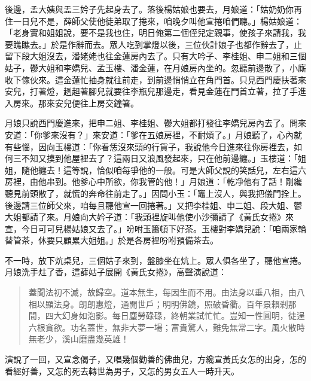 後邊，孟大姨與盂三妗子先起身去了。落後楊姑娘也要去，月娘道：「姑奶奶你再住一日兒不是，薛師父使他徒弟取了捲來，咱晚夕叫他宣捲咱們聽。」楊姑娘道：「老身實和姐姐說，要不是我也住，明日俺第二個侄兒定親事，使孩子來請我，我要瞧瞧去。」於是作辭而去。眾人吃到掌燈以後，三位伙計娘子也都作辭去了，止留下段大姐沒去，潘姥姥也往金蓮房內去了。只有大吟子、李桂姐、申二姐和三個姑子，鬱大姐和李嬌兒、孟玉樓、潘金蓮，在月娘房內坐的。忽聽前邊散了，小廝收下傢伙來。這金蓮忙抽身就往前走，到前邊悄悄立在角門首。只見西門慶扶著來安兒，打著燈，趔趄著腳兒就要往李瓶兒那邊走，看見金蓮在門首立著，拉了手進入房來。那來安兒便往上房交鐘箸。

月娘只說西門慶進來，把申二姐、李桂姐、鬱大姐都打發往李嬌兒房內去了。問來安道：「你爹來沒有？」來安道：「爹在五娘房裡，不耐煩了。」月娘聽了，心內就有些惱，因向玉樓道：「你看恁沒來頭的行貨子，我說他今日進來往你房裡去，如何三不知又摸到他屋裡去了？這兩日又浪風發起來，只在他前邊纏。」玉樓道：「姐姐，隨他纏去！這等說，恰似咱每爭他的一般。可是大師父說的笑話兒，左右這六房裡，由他串到。他爹心中所欲，你我管的他！」月娘道：「乾凈他有了話！剛纔聽見前頭散了，就慌的奔命往前走了。」因問小玉：「竈上沒人，與我把儀門拴上。後邊請三位師父來，咱每且聽他宣一回捲著。」又把李桂姐、申二姐、段大姐、鬱大姐都請了來。月娘向大妗子道：「我頭裡旋叫他使小沙彌請了《黃氏女捲》來宣，今日可可兒楊姑娘又去了。」吩咐玉簫頓下好茶。玉樓對李嬌兒說：「咱兩家輪替管茶，休要只顧累大姐姐。」於是各房裡吩咐預備茶去。

不一時，放下炕桌兒，三個姑子來到，盤膝坐在炕上。眾人俱各坐了，聽他宣捲。月娘洗手炷了香，這薛姑子展開《黃氏女捲》，高聲演說道：
\begin{quote}
蓋聞法初不滅，故歸空。道本無生，每因生而不用。由法身以垂八相，由八相以顯法身。朗朗惠燈，通開世戶；明明佛鏡，照破昏衢。百年景賴剎那間，四大幻身如泡影。每日塵勞碌碌，終朝業試忙忙。豈知一性圓明，徒逞六根貪欲。功名蓋世，無非大夢一場；富貴驚人，難免無常二字。風火散時無老少，溪山磨盡幾英雄！
\end{quote}

演說了一回，又宣念偈子，又唱幾個勸善的佛曲兒，方纔宣黃氏女怎的出身，怎的看經好善，又怎的死去轉世為男子，又怎的男女五人一時升天。

